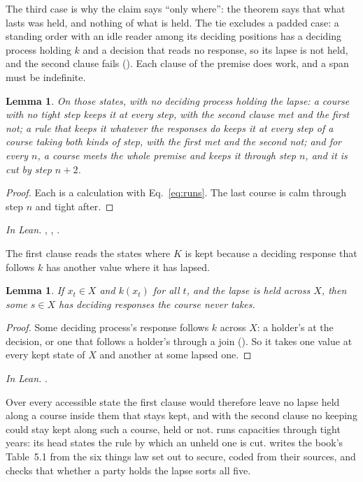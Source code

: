 \documentclass[11pt]{amsart}
\makeatletter
\newcounter{lemma@item}
\theoremstyle{plain}
\newtheorem{lemma}[lemma@item]{Lemma}
\newcommand{\inlean}[1]{\par\noindent\textit{In Lean.} #1\par\medskip}
\makeatother
\begin{document}
The third case is why the claim says ``only where'': the theorem says that what lasts was held, and nothing of what is held. The tie excludes a padded case: a standing order with an idle reader among its deciding positions has a deciding process holding $k$ and a decision that reads no response, so its lapse is not held, and the second clause fails (). Each clause of the premise does work, and a span must be indefinite.

\begin{lemma}\label{lem:clauses}
On those states, with no deciding process holding the lapse: a course with no tight step keeps it at every step, with the second clause met and the first not; a rule that keeps it whatever the responses do keeps it at every step of a course taking both kinds of step, with the first met and the second not; and for every $n$, a course meets the whole premise and keeps it through step $n$, and it is cut by step $n+2$.
\end{lemma}
\begin{proof}
Each is a calculation with Eq.~\eqref{eq:runs}. The last course is calm through step $n$ and tight after.
\end{proof}
\inlean{, \lean{lasts_without_occasion}, \lean{lasts_any_finite_span}.}

The first clause reads the states where $K$ is kept because a deciding response that follows $k$ has another value where it has lapsed.

\begin{lemma}\label{lem:kept-states}
If $x_t\in X$ and $k(x_t)$ for all $t$, and the lapse is held across $X$, then some $s\in X$ has deciding responses the course never takes.
\end{lemma}
\begin{proof}
Some deciding process's response follows $k$ across $X$: a holder's at the decision, or one that follows a holder's through a join (). So it takes one value at every kept state of $X$ and another at some lapsed one.
\end{proof}
\inlean{.}

Over every accessible state the first clause would therefore leave no lapse held along a course inside them that stays kept, and with the second clause no keeping could stay kept along such a course, held or not.  runs capacities through tight years: its head states the rule by which an unheld one is cut.  writes the book's Table~5.1 from the six things law set out to secure, coded from their sources, and checks that whether a party holds the lapse sorts all five.
\end{document}
